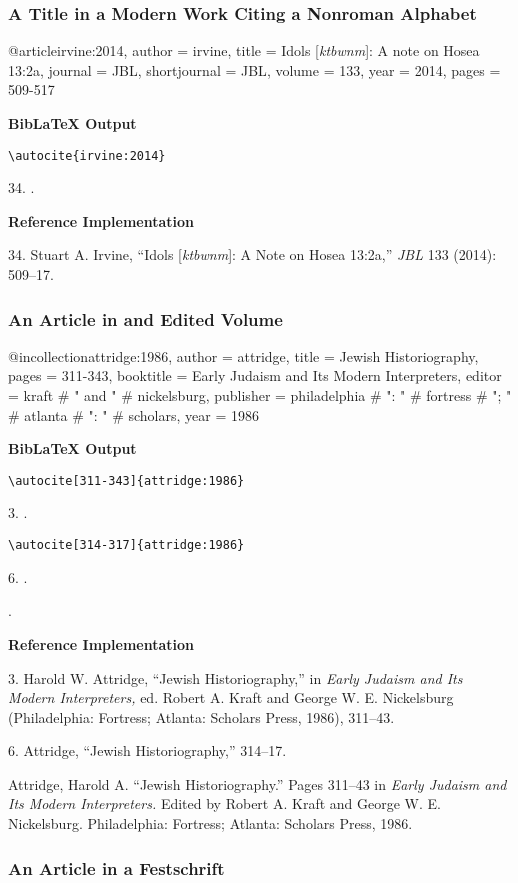 \documentclass[a4paper]{article}
\newcommand\citetest[5]{%
  {\textbf{BibLaTeX Output}\par
   \nobreak
   \texttt{\textbackslash autocite[#2]\{#5\}}\par
   \color{biblatex-colour}
   #1. \cite[#2]{#5}.\par
   \color{black}
   \texttt{\textbackslash autocite[#4]\{#5\}}\par
   \color{biblatex-colour}
   #3. \cite[#4]{#5}.\par
   \hangindent\bibindent\bibentrycite{#5}.\par}}
\newcommand\citetestnsnpnb[2]{%
  {\textbf{BibLaTeX Output}\par
   \nobreak
   \texttt{\textbackslash autocite\{#2\}}\par
   \color{biblatex-colour}
   #1. \cite{#2}.\par}}
\newenvironment{refimp}{%
  \begin{minipage}{\linewidth}
    \setlength{\parskip}{1ex}
    \textbf{Reference Implementation}\par
    \nobreak
    \color{reference-colour}
}{\end{minipage}}
\newenvironment{vb}{%
  \setlength{\parskip}{0pt}
  \verbatim}{\endverbatim}
\begin{document}
\subsubsection{A Title in a Modern Work Citing a Nonroman Alphabet}

\begin{vb}
@article{irvine:2014,
  author = irvine,
  title = {Idols [\emph{ktbwnm}]: A note on Hosea 13:2a},
  journal = JBL,
  shortjournal = {JBL},
  volume = {133},
  year = {2014},
  pages = {509-517}
}
\end{vb}

\citetestnsnpnb{34}{irvine:2014}

\begin{refimp}
  34. Stuart A. Irvine, “Idols [\emph{ktbwnm}]: A Note on Hosea 13:2a,”
  \emph{JBL} 133 (2014): 509–17.
\end{refimp}

\subsubsection{An Article in and Edited Volume}

\begin{vb}
@incollection{attridge:1986,
  author = attridge,
  title = {Jewish Historiography},
  pages = {311-343},
  booktitle = {Early Judaism and Its Modern Interpreters},
  editor = kraft # " and " # nickelsburg,
  publisher = philadelphia # ": " # fortress # "; " #
              atlanta # ": " # scholars,
  year = {1986}
}
\end{vb}  

\citetest{3}{311-343}{6}{314-317}{attridge:1986}

\begin{refimp}
  3. Harold W. Attridge, “Jewish Historiography,” in \emph{Early Judaism and
  Its Modern Interpreters,} ed. Robert A. Kraft and George W. E. Nickelsburg
  (Philadelphia: Fortress; Atlanta: Scholars Press, 1986), 311–43.
  
  6. Attridge, “Jewish Historiography,” 314–17.

  Attridge, Harold A. “Jewish Historiography.” Pages 311–43 in \emph{Early
  Judaism and Its Modern Interpreters.} Edited by Robert A. Kraft and George
  W. E. Nickelsburg. Philadelphia: Fortress; Atlanta: Scholars Press, 1986.
\end{refimp}

\subsubsection{An Article in a Festschrift}
\end{document}
